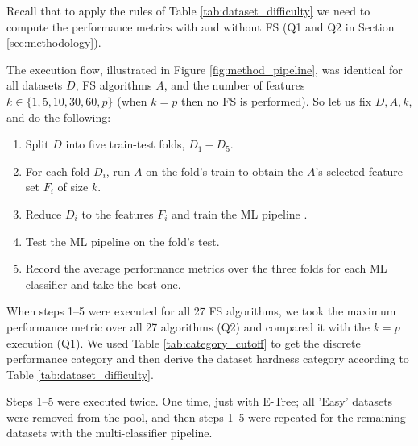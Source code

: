 \documentclass[preprint,12pt,authoryear]{elsarticle}
\begin{document}
Recall that to apply the rules of Table \ref{tab:dataset_difficulty} we need to compute the performance metrics with and without FS (Q1 and Q2 in Section \ref{sec:methodology}).



The execution flow, illustrated in Figure 
\ref{fig:method_pipeline}, was identical for all datasets $D$, FS algorithms $A$, and the number of features $k \in \{1,5,10,30,60,p\}$ (when $k=p$ then no FS is performed). So let us fix $D,A,k$, and do the following:
\begin{enumerate}
    \item Split $D$ into five train-test folds, $D_1-D_5$.
    \item For each fold $D_i$, run $A$  on the fold's train to obtain the $A$'s selected feature set $F_i$ of size $k$.
    \item Reduce $D_i$ to the features $F_i$ and train the ML pipeline .
    \item Test the ML pipeline on the fold's test. 
    \item Record the average performance metrics over the three folds for each ML classifier and take the best one.
\end{enumerate}

When steps 1--5 were executed for all 27 FS algorithms, we took the maximum performance metric over all 27 algorithms (Q2) and compared it with the $k=p$ execution (Q1). 
We used Table \ref{tab:category_cutoff} to get the discrete performance category and then derive the dataset hardness category according to Table \ref{tab:dataset_difficulty}.

Steps 1--5 were executed twice. One time, just with E-Tree; all 'Easy' datasets were removed from the pool, and then steps 1--5 were repeated for the remaining datasets with the multi-classifier pipeline.

\vspace{3.5}
\end{document}
